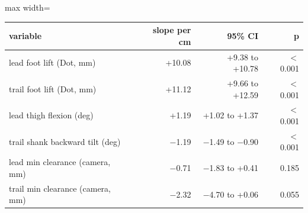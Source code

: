 \begin{adjustbox}{max width=\textwidth}
{\footnotesize
\begin{tabular}{p{6cm}rrr}
\toprule
\textbf{variable} & \textbf{slope per cm} & \textbf{95\% CI} & \textbf{p} \\
\midrule
lead foot lift (Dot, mm) & +10.08 & +9.38 to +10.78 & $<$ 0.001 \\
trail foot lift (Dot, mm) & +11.12 & +9.66 to +12.59 & $<$ 0.001 \\
lead thigh flexion (deg) & +1.19 & +1.02 to +1.37 & $<$ 0.001 \\
trail shank backward tilt (deg) & $-$1.19 & $-$1.49 to $-$0.90 & $<$ 0.001 \\
lead min clearance (camera, mm) & $-$0.71 & $-$1.83 to +0.41 & 0.185 \\
trail min clearance (camera, mm) & $-$2.32 & $-$4.70 to +0.06 & 0.055 \\
\bottomrule
\end{tabular}
}
\end{adjustbox}
